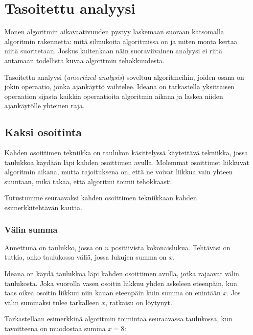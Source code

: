 \chapter{Tasoitettu analyysi}

Monen algoritmin aikavaativuuden pystyy laskemaan
suoraan katsomalla algoritmin rakennetta:
mitä silmukoita algoritmissa on ja miten monta
kertaa niitä suoritetaan.
Joskus kuitenkaan näin suoraviivainen analyysi ei
riitä antamaan todellista kuvaa algoritmin tehokkuudesta.

Tasoitettu analyysi (\textit{amortized analysis})
soveltuu algoritmeihin, joiden osana on jokin operaatio,
jonka ajankäyttö vaihtelee.
Ideana on tarkastella yksittäisen operaation
sijasta kaikkia operaatioita algoritmin
aikana ja laskea niiden ajankäytölle yhteinen raja.

\section{Kaksi osoitinta}

Kahden osoittimen tekniikka on taulukon käsittelyssä
käytettävä tekniikka, jossa taulukkoa käydään läpi
kahden osoittimen avulla.
Molemmat osoittimet liikkuvat algoritmin aikana,
mutta rajoituksena on, että ne voivat liikkua vain
yhteen suuntaan, mikä takaa, että algoritmi toimii tehokkaasti.

Tutustumme seuraavaksi kahden osoittimen tekniikkaan
kahden esimerkkitehtävän kautta.

\subsection{Välin summa}

\begin{task}
Annettuna on taulukko, jossa on $n$ positiivista kokonaislukua.
Tehtäväsi on tutkia, onko taulukossa väliä,
jossa lukujen summa on $x$.
\end{task}

Ideana on käydä taulukkoa läpi kahden osoittimen
avulla, jotka rajaavat välin taulukosta.
Joka vuorolla vasen osoitin liikkuu
yhden askeleen eteenpäin, kun taas oikea osoitin
liikkuu niin kauan eteenpäin kuin summa on enintään $x$.
Jos välin summaksi tulee tarkalleen $x$, ratkaisu on löytynyt.

Tarkastellaan esimerkkinä algoritmin toimintaa
seuraavassa taulukossa, kun tavoitteena on muodostaa summa $x=8$:
\begin{center}
\end{center}

